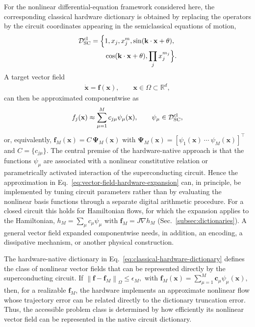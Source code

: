 \documentclass[pra,twocolumn,superscriptaddress,nofootinbib,floatfix]{revtex4-2}
\theoremstyle{remark}
\begin{document}
For the nonlinear differential-equation framework considered here, the corresponding classical hardware dictionary is obtained by replacing the operators by the circuit coordinates appearing in the semiclassical equations of motion,
\begin{align}
\mathcal D_{\rm SC}^{\rm cl}=\Big\{&1,x_j,x_j^m,\sin(\mathbf k\cdot\mathbf x+\theta),\nonumber\\
&\cos(\mathbf k\cdot\mathbf x+\theta),\prod_j x_j^{m_j}\Big\}.
\label{eq:classical-hardware-dictionary}
\end{align}
A target vector field
\begin{align}
\dot{\mathbf x} = \mathbf f(\mathbf x), \qquad \mathbf x\in\Omega\subset\mathbb R^d,
\label{eq:general-nonlinear-system}
\end{align}
can then be approximated componentwise as
\begin{align}
f_j(\mathbf x)\approx\sum_{\mu=1}^{M}c_{j\mu}\psi_\mu(\mathbf x),\qquad\psi_\mu\in\mathcal D_{\rm SC}^{\rm cl},
\label{eq:vector-field-hardware-expansion}
\end{align}
or, equivalently,
\(\mathbf f_M(\mathbf x) = C\,\boldsymbol{\Psi}_M(\mathbf x)\) with \(\boldsymbol{\Psi}_M(\mathbf x) = [\psi_1(\mathbf x)\ \cdots\ \psi_M(\mathbf x) ]^\top\) and \(C=\{c_{j\mu}\}\). The central premise of the hardware-native approach is that the functions \(\psi_\mu\) are associated with a nonlinear constitutive relation or parametrically activated interaction of the superconducting circuit. Hence the approximation in Eq.~\eqref{eq:vector-field-hardware-expansion} can, in principle, be implemented by tuning circuit parameters rather than by evaluating the nonlinear basis functions through a separate digital arithmetic procedure. For a closed circuit this holds for Hamiltonian flows, for which the expansion applies to the Hamiltonian, \(h_M=\sum_\mu c_\mu\psi_\mu\) with \(\mathbf f_M=J\nabla h_M\) (Sec.~\ref{subsec:dictionaries}). A general vector field expanded componentwise needs, in addition, an encoding, a dissipative mechanism, or another physical construction.

The hardware-native dictionary in Eq.~\eqref{eq:classical-hardware-dictionary} defines the class of nonlinear vector fields that can be represented directly by the superconducting circuit. If
\(\left\|\mathbf f-\mathbf f_M\right\|_{\Omega}\leq\epsilon_M,\)
with
\(\mathbf f_M(\mathbf x)=\sum_{\mu=1}^{M}\mathbf c_{\mu}\psi_{\mu}(\mathbf x),\)
then, for a realizable \(\mathbf f_M\), the hardware implements an approximate nonlinear flow whose trajectory error can be related directly to the dictionary truncation error. Thus, the accessible problem class is determined by how efficiently its nonlinear vector field can be represented in the native circuit dictionary.
\end{document}
